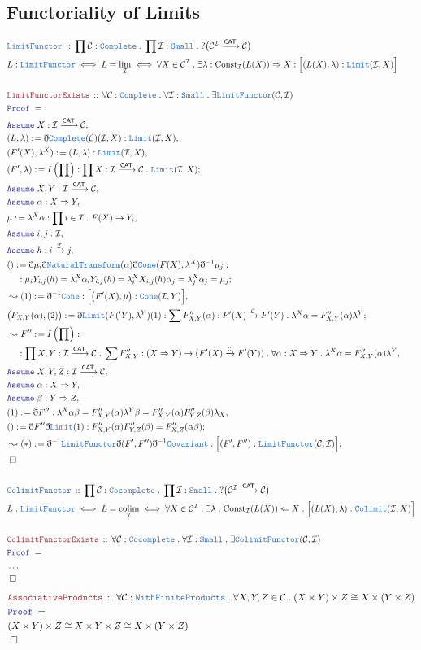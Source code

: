 \documentclass[12pt]{scrartcl}
\newcommand{\TYPE}[1]{\textcolor{NavyBlue}{\mathtt{#1}}}
\newcommand{\LOGIC}[1]{\textcolor{Blue}{\mathtt{#1}}}
\newcommand{\THM}[1]{\textcolor{Maroon}{\mathtt{#1}}}
\renewcommand{\.}{\; . \;}
\newcommand{\de}{: \kern 0.1pc =}
\newcommand{\Theorem}[2]{& \THM{#1} \, :: \, #2 \\ & \Proof = \\ }
\newcommand{\DeclareType}[2]{& \TYPE{#1} \, :: \, #2 \\}
\newcommand{\DefineNamedType}[4]{& #1 : \TYPE{#2} \iff #3 \iff #4 \\}
\newcommand{\NewLine}{\\ & \kern 1pc}
\newcommand{\Page}[1]{ \begin{align*} #1 \end{align*}   }
\newcommand{ \bd }{ \ByDef }
\newcommand{\NoProof}{ & \ldots \\ \EndProof}
\newcommand{\Arrow}{\xrightarrow}
\newcommand{\Say}[3]{& #1 \de #2 : #3, \\}
\newcommand{\Conclude}[3]{& #1 \de #2 : #3; \\}
\newcommand{\Derive}[3]{& \leadsto #1 \de #2 : #3, \\}
\newcommand{\DeriveConclude}[3]{& \leadsto #1 \de #2 : #3 ; \\}
\newcommand{\Assume}[2]{& \LOGIC{Assume} \; #1 : #2, \\}
\newcommand{\QED}{\; \square}
\newcommand{\EndProof}{& \QED \\}
\newcommand{\ByDef}{\eth}
\newcommand{\Proof}{\LOGIC{Proof} \; }
\newcommand{\Cov}{\TYPE{Covariant}}
\newcommand{\NT}{\TYPE{NaturalTransform}}
\DeclareMathOperator*{\colim}{colim}
\newcommand{\C}{\mathcal{C}}
\newcommand{\I}{\mathcal{I}}
\newcommand{\CAT}{\mathsf{CAT}}
\begin{document}
\subsection{Functoriality of Limits}
\Page{ 
	\DeclareType{LimitFunctor}{\prod \C : \TYPE{Complete} \. \prod \I : \TYPE{Small} \. ?\big( \C^\I \Arrow{\CAT} \C\big)}
	\DefineNamedType{L}{LimitFunctor}{L = \lim_\I}{\forall X \in \C^\I \. 
		\exists \lambda : \mathrm{Const}_\I(L(X)) \Rightarrow X : \Big[(L(X),\lambda) : \TYPE{Limit}(\I,X)\Big]}
	\\
	\Theorem{LimitFunctorExists}{\forall \C : \TYPE{Complete} \. \forall \I : \TYPE{Small} \. 
		\exists \TYPE{LimitFunctor}(\C,\I)}
	\Assume{X}{\I \Arrow{\CAT} \C}
	\Say{(L,\lambda)}{\bd \TYPE{Complete}(\C)(\I,X)}{\TYPE{Limit}(\I,X)}
	\Say{(F'(X),\lambda^X)}{(L,\lambda)}{ \TYPE{Limit}(\I,X)  }
	\Conclude{(F',\lambda)}{I\left(\prod\right)}{ \prod X : \I \Arrow{\CAT} \C \. \TYPE{Limit}(\I,X) }
	\Assume{X,Y}{\I \Arrow{\CAT} \C}
	\Assume{\alpha}{X \Rightarrow Y}
	\Say{\mu}{ \lambda^X \alpha }{\prod i \in \I \. F(X) \to Y_i}
	\Assume{i,j}{\I}
	\Assume{h}{ i \Arrow{\I} j  }
	\Conclude{()}{\bd \mu_i \bd \NT(\alpha) \bd \TYPE{Cone}(F(X),\lambda^X)\bd^{-1} \mu_j}{ 
		\NewLine :
		\mu_i Y_{i,j}(h) = 
		\lambda^X_i \alpha_i Y_{i,j}(h) = 
		\lambda^X_i X_{i,j}(h) \alpha_j =
		\lambda^X_j \alpha_j =
		\mu_j
	}
	\Derive{(1)}{ \bd^{-1} \TYPE{Cone} }{ \Big[ \big(F'(X),\mu\big) : \TYPE{Cone}(\I,Y) \Big]  }
	\Conclude{\big(F_{X,Y}(\alpha),(2)\big) }{\bd \TYPE{Limit}(F('Y),\lambda^Y)(1)}
	{ \sum F_{X,Y}''(\alpha) : F'(X) \Arrow{\C} F'(Y) \. \lambda^X \alpha = F_{X,Y}''(\alpha)\lambda^Y }
	\Derive{F''}{I\left(\prod\right)}
	{
		\NewLine :
		\prod X,Y : \I \Arrow{\CAT} \C \. \sum F''_{X,Y} :  (X \Rightarrow Y) \to (F'(X) \Arrow{\C} F'(Y))
	 	\. \forall \alpha : X \Rightarrow Y \. \lambda^X \alpha = F_{X,Y}''(\alpha)\lambda^Y
	}
	\Assume{X,Y,Z}{\I \Arrow{\CAT} \C}
	\Assume{\alpha}{X \Rightarrow Y}
	\Assume{\beta}{Y \Rightarrow Z}
	\Say{(1)}{\bd F''}{
		\lambda^X \alpha \beta = 
		F_{X,Y}''(\alpha) \lambda^Y \beta  =
		F_{X,Y}''(\alpha) F_{Y,Z}''(\beta) \lambda_X }
	\Conclude{()}{\bd F'' \bd \TYPE{Limit} (1)}{F_{X,Y}''(\alpha)F_{Y,Z}''(\beta) = F''_{X,Z}(\alpha \beta)}
	\DeriveConclude{(*)}{\bd^{-1} \TYPE{LimitFunctor} \bd (F',F'') \bd^{-1} \Cov}
	{\Big[ (F',F'') : \TYPE{LimitFunctor}(\C,\I) \Big]}
	\EndProof
	\\
	\DeclareType{ColimitFunctor}{\prod \C : \TYPE{Cocomplete} \. 
		\prod \I : \TYPE{Small} \. ?\big( \C^\I \Arrow{\CAT} \C\big)}
	\DefineNamedType{L}{LimitFunctor}{L = \colim_\I}{\forall X \in \C^\I \. 
		\exists \lambda : \mathrm{Const}_\I(L(X)) \Leftarrow X : \Big[(L(X),\lambda) : \TYPE{Colimit}(\I,X)\Big]}
	\\
	\Theorem{ColimitFunctorExists}{\forall \C : \TYPE{Cocomplete} \. \forall \I : \TYPE{Small} \. 
		\exists \TYPE{ColimitFunctor}(\C,\I)}
	\NoProof
} \Page{
	\Theorem{AssociativeProducts}{\forall \C : \TYPE{WithFiniteProducts} \.  \forall X,Y,Z \in \C \.
		(X \times Y) \times Z \cong X \times (Y \times Z) }
&    (X \times Y) \times Z \cong X \times Y \times Z \cong X \times (Y \times Z)      \\
\EndProof
}
\newpage
\end{document}
